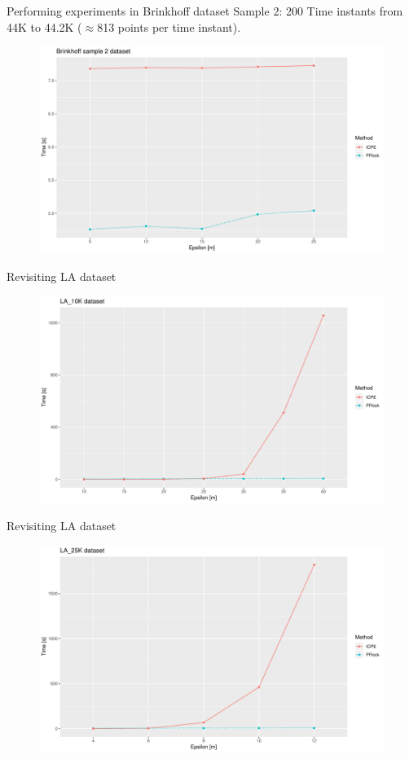 \documentclass{beamer}
\begin{document}
\begin{frame}{Performing experiments in Brinkhoff dataset}
    {\small Sample 2: 200 Time instants from 44K to 44.2K ($\approx$813 points per time instant).}
    \centering
    \begin{figure}
        \includegraphics[width=.9\textwidth]{ICPE_B43K-44K}
    \end{figure}    
\end{frame}

\begin{frame}{Revisiting LA dataset}
    \centering
    \begin{figure}
        \includegraphics[width=.9\textwidth]{ICPE_10K}
    \end{figure}    
\end{frame}

\begin{frame}{Revisiting LA dataset}
    \centering
    \begin{figure}
        \includegraphics[width=.9\textwidth]{ICPE_25K}
    \end{figure}    
\end{frame}
\end{document}
